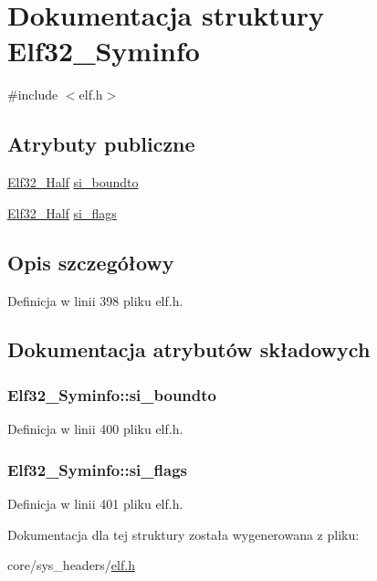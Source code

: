 \hypertarget{struct_elf32___syminfo}{\section{Dokumentacja struktury Elf32\-\_\-\-Syminfo}
\label{struct_elf32___syminfo}
}


{\ttfamily \#include $<$elf.\-h$>$}

\subsection*{Atrybuty publiczne}
\begin{DoxyCompactItemize}
\item 
\hyperlink{elf_8h_a2ff0787d7d1bae0f251192806a2974ca}{Elf32\-\_\-\-Half} \hyperlink{struct_elf32___syminfo_a9d321c4cc96a0324a9b2dbe98bca2bd9}{si\-\_\-boundto}
\item 
\hyperlink{elf_8h_a2ff0787d7d1bae0f251192806a2974ca}{Elf32\-\_\-\-Half} \hyperlink{struct_elf32___syminfo_a3c3931c5ff4c0681e1511987ea83649e}{si\-\_\-flags}
\end{DoxyCompactItemize}


\subsection{Opis szczegółowy}


Definicja w linii 398 pliku elf.\-h.



\subsection{Dokumentacja atrybutów składowych}
\hypertarget{struct_elf32___syminfo_a9d321c4cc96a0324a9b2dbe98bca2bd9}{
\subsubsection[{si\-\_\-boundto}]{ Elf32\-\_\-\-Syminfo\-::si\-\_\-boundto}}\label{struct_elf32___syminfo_a9d321c4cc96a0324a9b2dbe98bca2bd9}


Definicja w linii 400 pliku elf.\-h.

\hypertarget{struct_elf32___syminfo_a3c3931c5ff4c0681e1511987ea83649e}{
\subsubsection[{si\-\_\-flags}]{ Elf32\-\_\-\-Syminfo\-::si\-\_\-flags}}\label{struct_elf32___syminfo_a3c3931c5ff4c0681e1511987ea83649e}


Definicja w linii 401 pliku elf.\-h.



Dokumentacja dla tej struktury została wygenerowana z pliku\-:\begin{DoxyCompactItemize}
\item 
core/sys\-\_\-headers/\hyperlink{elf_8h}{elf.\-h}\end{DoxyCompactItemize}
